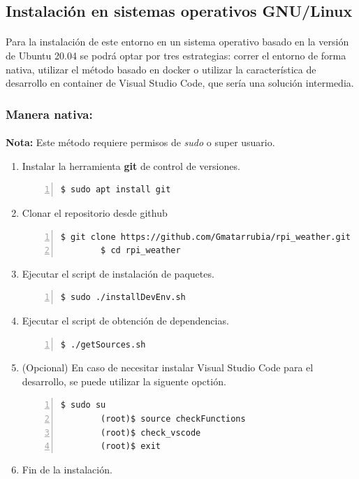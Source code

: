 \subsection{Instalación en sistemas operativos GNU/Linux}

\paragraph{}Para la instalación de este entorno en un sistema operativo basado en
la versión de Ubuntu 20.04 se podrá optar por tres estrategias: correr el entorno de
forma nativa, utilizar el método basado en docker o utilizar la característica de
desarrollo en container de Visual Studio Code, que sería una solución intermedia.

\subsubsection{Manera nativa:}

\paragraph{}\textbf{Nota:} Este método requiere permisos de \emph{sudo} o super usuario.

\begin{enumerate}
    \item Instalar la herramienta \textbf{\gls{git}} de control de versiones.
    \begin{lstlisting}[style=consola, numbers=left]
        $ sudo apt install git
    \end{lstlisting}

    \item Clonar el repositorio desde github
    \begin{lstlisting}[style=consola, numbers=left]
        $ git clone https://github.com/Gmatarrubia/rpi_weather.git
        $ cd rpi_weather
    \end{lstlisting}

    \item Ejecutar el script de instalación de paquetes.
    \begin{lstlisting}[style=consola, numbers=left]
        $ sudo ./installDevEnv.sh
    \end{lstlisting}

    \item Ejecutar el script de obtención de dependencias.
    \begin{lstlisting}[style=consola, numbers=left]
        $ ./getSources.sh
    \end{lstlisting}

    \item (Opcional) En caso de necesitar instalar Visual Studio Code para el desarrollo,
    se puede utilizar la siguente opctión.
    \begin{lstlisting}[style=consola, numbers=left]
        $ sudo su
        (root)$ source checkFunctions
        (root)$ check_vscode
        (root)$ exit
    \end{lstlisting}

    \item Fin de la instalación.
\end{enumerate}

